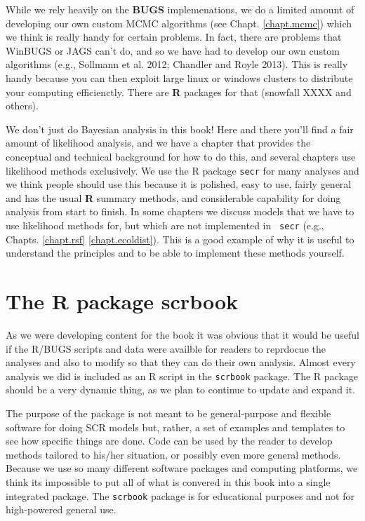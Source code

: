 While we rely heavily on the {\bf BUGS} implemenations, we do a limited amount of developing our own custom MCMC algorithms
(see Chapt. \ref{chapt.mcmc}) which we think is really handy for certain
problems. In fact, there are problems that WinBUGS or JAGS can't do,
and so we have had to develop our own custom algorithms (e.g.,
Sollmann et al. 2012; Chandler and Royle 2013). 
This is really handy because you can then exploit large linux or
windows clusters to distribute your computing efficienctly. There are
{\bf R} packages for that (snowfall XXXX and others).

We don't just do Bayesian analysis in this book! Here and there you'll
find a fair amount of likelihood analysis, and we have a chapter that
provides the conceptual and technical background for how to do this,
and several chapters use likelihood methods exclusively. We use the R
package \mbox{\tt secr} \citep{efford_etal:2009euring} for many
analyses and we think people should use this because it is polished,
easy to use, fairly general and has the usual {\bf R} summary methods,
and considerable capability for doing analysis from start to
finish. In some chapters we discuss models that we have to use
likelihood methods for, but which are not implemented in \mbox{\tt
  secr} (e.g., Chapts. \ref{chapt.rsf} \ref{chapt.ecoldist}). This is
a good example of why it is useful to understand the principles and to
be able to implement these methods yourself.

\section*{The R package scrbook}

As we were developing content for the book it was obvious that it
would be useful if the R/BUGS scripts and data were availble for
readers to reprdocue the analyses and also to modify so that they can
do their own analysis.  Almost every analysis we did is included as an
R script in the \mbox{\tt scrbook} package.
The R package should be a very dynamic thing, as we plan to
continue to update and expand it.

The purpose of the package is not meant to be general-purpose and
flexible software for doing SCR models but, rather, a set of examples
and templates to see how specific things are done. Code can be used
by the reader to develop methods tailored to his/her situation, or
possibly even more general methods.  Because we use so many different
software packages and computing platforms, we think its impossible to
put all of what is convered in this book into a single integrated
package.  The \mbox{\tt scrbook} package is for educational purposes
and not for high-powered general use.


